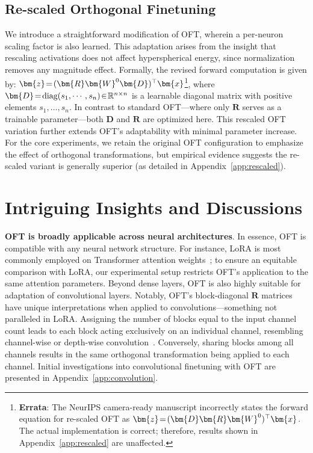 \subsection{Re-scaled Orthogonal Finetuning}

We introduce a straightforward modification of OFT, wherein a per-neuron scaling factor is also learned. This adaptation arises from the insight that rescaling activations does not affect hyperspherical energy, since normalization removes any magnitude effect. Formally, the revised forward computation is given by: $\thickmuskip=2mu \medmuskip=2mu\bm{z}=(\bm{R}\bm{W}^0\bm{D})^\top\bm{x}$\footnote{\textbf{Errata}: The NeurIPS camera-ready manuscript incorrectly states the forward equation for re-scaled OFT as $\thickmuskip=2mu \medmuskip=2mu\bm{z}=(\bm{D}\bm{R}\bm{W}^0)^\top\bm{x}$. The actual implementation is correct; therefore, results shown in Appendix~\ref{app:rescaled} are unaffected.}, where $\thickmuskip=2mu \medmuskip=2mu \bm{D}=\text{diag}(s_1,\cdots,s_n)\in\mathbb{R}^{n\times n}$ is a learnable diagonal matrix with positive elements $s_1, \dots, s_n$. In contrast to standard OFT—where only $\bm{R}$ serves as a trainable parameter—both $\bm{D}$ and $\bm{R}$ are optimized here. This rescaled OFT variation further extends OFT's adaptability with minimal parameter increase. For the core experiments, we retain the original OFT configuration to emphasize the effect of orthogonal transformations, but empirical evidence suggests the re-scaled variant is generally superior (as detailed in Appendix~\ref{app:rescaled}).

\section{Intriguing Insights and Discussions}

\textbf{OFT is broadly applicable across neural architectures}. In essence, OFT is compatible with any neural network structure. For instance, LoRA is most commonly employed on Transformer attention weights~\cite{hulora2022}; to ensure an equitable comparison with LoRA, our experimental setup restricts OFT's application to the same attention parameters. Beyond dense layers, OFT is also highly suitable for adaptation of convolutional layers. Notably, OFT’s block-diagonal $\bm{R}$ matrices have unique interpretations when applied to convolutions—something not paralleled in LoRA. Assigning the number of blocks equal to the input channel count leads to each block acting exclusively on an individual channel, resembling channel-wise or depth-wise convolution~\cite{chollet2017xception}. Conversely, sharing blocks among all channels results in the same orthogonal transformation being applied to each channel. Initial investigations into convolutional finetuning with OFT are presented in Appendix~\ref{app:convolution}.

